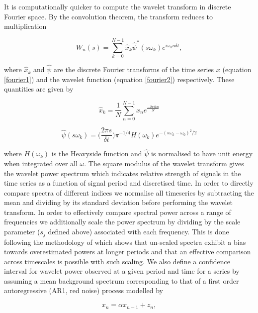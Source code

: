 It is computationally quicker to compute the wavelet transform in discrete Fourier space. By the convolution theorem, the transform reduces to multiplication

\begin{equation} \label{wavelet_transform2}
W_n(s) = \sum^{N - 1}_{k = 0} \hat{x}_{k} \hat{\psi}^* (s\omega_k) e^{i \omega_k n \delta t},
\end{equation}

where $\hat{x}_{k}$ and $\hat{\psi}$ are the discrete Fourier transforms of the time series $x$ (equation \ref{fourier1}) and the wavelet function (equation \ref{fourier2}) respectively. These quantities are given by 

\begin{equation} \label{fourier1}
\hat{x}_k = \frac{1}{N} \sum^{N-1}_{n = 0} x_n e^{\frac{-2\pi i k n}{N}}
\end{equation}

\begin{equation} \label{fourier2}
\hat{\psi}(s\omega_k) = \bigg(\frac{2 \pi s}{\delta t}\bigg) \pi^{-1/4}H(\omega_k) e^{-(s\omega_k - \omega_0)^2/2}
\end{equation}

where $H(\omega_k)$ is the Heavyside function and $\hat{\psi}$ is normalised to have unit energy when integrated over all $\omega$. The square modulus of the wavelet transform gives the wavelet power spectrum which indicates relative strength of signals in the time series as a function of signal period and discretised time. In order to directly compare spectra of different indices we normalise all timeseries by subtracting the mean and dividing by its standard deviation before performing the wavelet transform. In order to effectively compare spectral power across a range of frequencies we additionally scale the power spectrum by dividing by the scale parameter ($s_j$ defined above) associated with each frequency. This is done following the methodology of \cite{liuRectification2007} which shows that un-scaled spectra exhibit a bias towards overestimated powers at longer periods and that an effective comparison across timescales is possible with such scaling. We also define a confidence interval for wavelet power observed at a given period and time for a series by assuming a mean background spectrum corresponding to that of a first order autoregressive (AR1, red noise) process modelled by

\begin{equation} \label{rednoise}
x_n = \alpha x_{n - 1} + z_n,
\end{equation}

